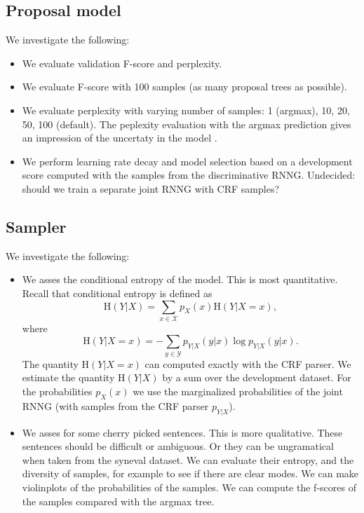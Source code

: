 \subsection{Proposal model} We investigate the following:
\begin{itemize}
  \item We evaluate validation F-score and perplexity.
  \item We evaluate F-score with 100 samples (as many proposal trees as possible).
  \item We evaluate perplexity with varying number of samples: 1 (argmax), 10, 20, 50, 100 (default). The peplexity evaluation with the argmax prediction gives an impression of the uncertaty in the model \citep{buys2018exact}.
  \item  We perform learning rate decay and model selection based on a development score computed with the samples from the discriminative RNNG. Undecided: should we train a separate joint RNNG with CRF samples?
\end{itemize}

\subsection{Sampler} We investigate the following:
\begin{itemize}
  \item We asses the conditional entropy of the model. This is most quantitative. Recall that conditional entropy is defined as
  \begin{equation}
    \text{H}(Y|X) = \sum_{x \in \mathcal{X}} p_X(x)\text{H}(Y|X = x),
  \end{equation}
  where
  \begin{equation}
    \text{H}(Y|X = x) = - \sum_{y \in \mathcal{Y}} p_{Y|X}(y|x) \log p_{Y|X}(y|x).
  \end{equation}
  The quantity $\text{H}(Y|X = x)$ can computed exactly with the CRF parser. We estimate the quantity $\text{H}(Y|X)$ by a sum over the development dataset. For the probabilities $p_X(x)$ we use the marginalized probabilities of the joint RNNG (with samples from the CRF parser $p_{Y|X}$).
  \item We asses for some cherry picked sentences. This is more qualitative. These sentences should be difficult or ambiguous. Or they can be ungramatical when taken from the syneval dataset. We can evaluate their entropy, and the diversity of samples, for example to see if there are clear modes. We can make violinplots of the probabilities of the samples. We can compute the f-scores of the samples compared with the argmax tree.
\end{itemize}

